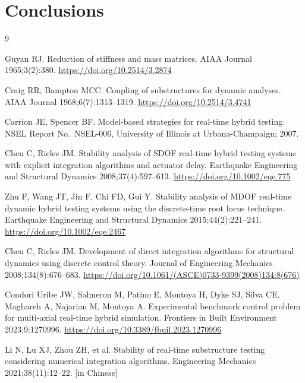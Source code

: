 \documentclass[11pt,a4paper]{article}
\numberwithin{equation}{section}
\begin{document}
\section{Conclusions} \label{sec6}



\begin{thebibliography}{9}
	
	Guyan RJ. Reduction of stiffness and mass matrices. AIAA Journal 1965;3(2):380. \url{https://doi.org/10.2514/3.2874}
	
	Craig RR, Bampton MCC. Coupling of substructures for dynamic analyses. AIAA Journal 1968;6(7):1313--1319. \url{https://doi.org/10.2514/3.4741}
	
	Carrion JE, Spencer BF. Model-based strategies for real-time hybrid testing. NSEL Report No.\ NSEL-006, University of Illinois at Urbana-Champaign; 2007.
	
	Chen C, Ricles JM. Stability analysis of SDOF real-time hybrid testing systems with explicit integration algorithms and actuator delay. Earthquake Engineering and Structural Dynamics 2008;37(4):597--613. \url{https://doi.org/10.1002/eqe.775}
	
	Zhu F, Wang JT, Jin F, Chi FD, Gui Y. Stability analysis of MDOF real-time dynamic hybrid testing systems using the discrete-time root locus technique. Earthquake Engineering and Structural Dynamics 2015;44(2):221--241. \url{https://doi.org/10.1002/eqe.2467}
	
	Chen C, Ricles JM. Development of direct integration algorithms for structural dynamics using discrete control theory. Journal of Engineering Mechanics 2008;134(8):676--683. \url{https://doi.org/10.1061/(ASCE)0733-9399(2008)134:8(676)}
	
	Condori Uribe JW, Salmeron M, Patino E, Montoya H, Dyke SJ, Silva CE, Maghareh A, Najarian M, Montoya A. Experimental benchmark control problem for multi-axial real-time hybrid simulation. Frontiers in Built Environment 2023;9:1270996. \url{https://doi.org/10.3389/fbuil.2023.1270996}
	
	Li N, Lu XJ, Zhou ZH, et al. Stability of real-time substructure testing considering numerical integration algorithms. Engineering Mechanics 2021;38(11):12--22. [in Chinese]
	
\end{thebibliography}
\end{document}
